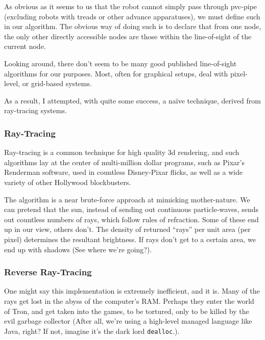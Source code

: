 \documentclass[letterpaper, 12pt]{article}
\begin{document}
\begin{multicols}{2}
As obvious as it seems to us that the robot cannot simply pass through pvc-pipe
(excluding robots with treads or other advance apparatuses), we must define such
in our algorithm. The obvious way of doing such is to declare that from one
node, the only other directly accessible nodes are those within the
line-of-sight of the current node.

Looking around, there don't seem to be many good published line-of-sight
algorithms for our purposes. Most, often for graphical setups, deal with
pixel-level, or grid-based systems.

As a result, I attempted, with quite some success, a na\"ive technique, derived
from ray-tracing systems.

\subsubsection{Ray-Tracing}

Ray-tracing is a common technique for high quality 3d rendering, and such
algorithms lay at the center of multi-million dollar programs, such as Pixar's
Renderman software, used in countless Disney-Pixar flicks, as well as a wide
variety of other Hollywood blockbusters.

The algorithm is a near brute-force approach at mimicking mother-nature. We can
pretend that the sun, instead of sending out continuous particle-waves, sends
out countless numbers of rays, which follow rules of refraction. Some of these
end up in our view, others don't. The density of returned ``rays'' per unit area
(per pixel) determines the resultant brightness. If rays don't get to a certain
area, we end up with shadows (See where we're going?).

\subsubsection{Reverse Ray-Tracing}

One might say this implementation is extremely inefficient, and it is. Many of
the rays get lost in the abyss of the computer's RAM. Perhaps they enter the
world of Tron, and get taken into the games, to be tortured, only to be killed
by the evil garbage collector (After all, we're using a high-level managed
language like Java, right? If not, imagine it's the dark lord
\texttt{dealloc}.).


\end{multicols}
\end{document}
